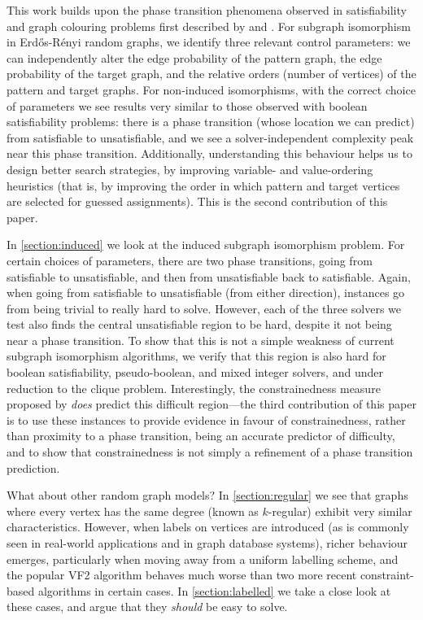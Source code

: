 \documentclass[twoside,11pt]{article}
\begin{document}
This work builds upon the phase transition phenomena observed in satisfiability and graph colouring
problems first described by  and
. For subgraph isomorphism in Erd\H{o}s-R\'enyi random graphs, we
identify three relevant control parameters: we can independently alter the edge probability of the
pattern graph, the edge probability of the target graph, and the relative orders (number of
vertices) of the pattern and target graphs.  For non-induced isomorphisms, with the correct choice
of parameters we see results very similar to those observed with boolean satisfiability problems:
there is a phase transition (whose location we can predict) from satisfiable to unsatisfiable, and
we see a solver-independent complexity peak near this phase transition. Additionally, understanding
this behaviour helps us to design better search strategies, by improving variable- and
value-ordering heuristics (that is, by improving the order in which pattern and target vertices are
selected for guessed assignments). This is the second contribution of this paper.

In \cref{section:induced} we look at the induced subgraph isomorphism problem.  For certain choices of
parameters, there are two phase transitions, going from satisfiable to unsatisfiable, and then from
unsatisfiable back to satisfiable. Again, when going from satisfiable to unsatisfiable (from either
direction), instances go from being trivial to really hard to solve. However, each of the three
solvers we test also finds the central unsatisfiable region to be hard, despite it not being near a
phase transition. To show that this is not a simple weakness of current subgraph isomorphism
algorithms, we verify that this region is also hard for boolean satisfiability, pseudo-boolean, and
mixed integer solvers, and under reduction to the clique problem. Interestingly, the constrainedness
measure proposed by  \emph{does} predict this difficult region---the
third contribution of this paper is to use these instances to provide evidence in favour of
constrainedness, rather than proximity to a phase transition, being an accurate predictor of
difficulty, and to show that constrainedness is not simply a refinement of a phase transition
prediction.

What about other random graph models? In \cref{section:regular} we see that graphs where every vertex
has the same degree (known as $k$-regular) exhibit very similar characteristics.  However, when
labels on vertices are introduced (as is commonly seen in real-world applications and in graph
database systems), richer behaviour emerges, particularly when moving away from a uniform labelling
scheme, and the popular VF2 algorithm \cite{DBLP:journals/pami/CordellaFSV04} behaves much worse
than two more recent constraint-based algorithms
\cite{DBLP:journals/ai/Solnon10,DBLP:conf/cp/McCreeshP15} in certain cases. In
\cref{section:labelled} we take a close look at these cases, and argue that they \emph{should} be
easy to solve.
\end{document}
